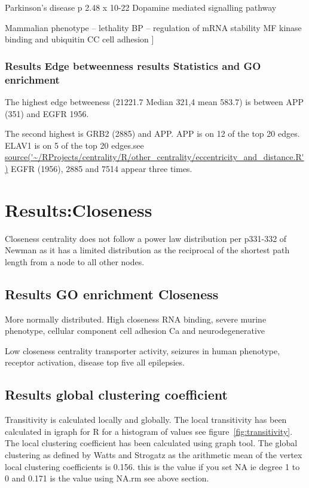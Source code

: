 Parkinson’s disease p 2.48 x 10-22
Dopamine mediated signalling pathway

Mammalian phenotype – lethality
BP – regulation of mRNA stability 
MF kinase binding and ubiquitin
CC cell adhesion
	]
\subsubsection{Results Edge betweenness results Statistics and GO enrichment}
The highest edge betweeness (21221.7 Median 321,4 mean 583.7) is between APP (351) and EGFR 1956.

The second highest is GRB2 (2885) and APP.
APP is on 12 of the top 20 edges. 
ELAV1 is on 5 of the top 20 edges.see \url{source('~/RProjects/centrality/R/other_centrality/eccentricity_and_distance.R')} EGFR (1956), 2885 and 7514 appear three times.

\section{Results:Closeness}
Closeness centrality  does not follow a power law distribution per p331-332 of Newman as it has a limited distribution as the reciprocal of the shortest path length from a node to all other nodes. 
\subsection{Results GO enrichment Closeness}
More normally distributed.
High closeness RNA binding, severe murine phenotype, cellular component cell adhesion
Ca and neurodegenerative

Low closeness centrality transporter activity, seizures in human phenotype, receptor activation, disease top five all epilepsies. 

\subsection{Results global clustering coefficient}
Transitivity is calculated locally and globally. The local transitivity has been calculated in igraph for R for a histogram of values see figure~\ref{fig:transitivity}. The local clustering coefficient has been calculated using graph tool. 
The global clustering as defined by Watts and Strogatz as the arithmetic mean of the vertex local clustering coefficients is 0.156.\cite{watts1998collective} this is the value if you set NA ie degree 1 to 0 and 0.171 is the value using NA.rm see above section. 

